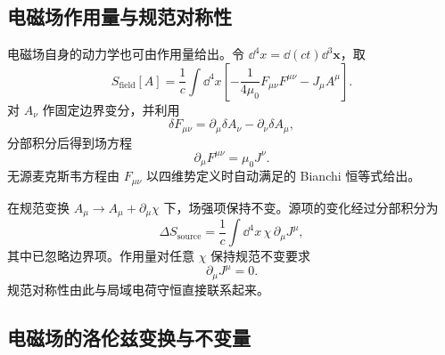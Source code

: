\documentclass[style=classic,color=full]{lc-article}
\begin{document}
\subsection{电磁场作用量与规范对称性}

电磁场自身的动力学也可由作用量给出。令 $\dd^4x=\dd(ct)\dd^3\bm x$，取
\begin{equation}
  S_{\mathrm{field}}[A]
  =\frac{1}{c}\int\dd^4x
  \left[
    -\frac{1}{4\mu_0}F_{\mu\nu}F^{\mu\nu}
    -J_\mu A^\mu
  \right].
  \label{eq:electromagneticaction}
\end{equation}
对 $A_\nu$ 作固定边界变分，并利用
\begin{equation*}
  \delta F_{\mu\nu}
  =\partial_\mu\delta A_\nu
  -\partial_\nu\delta A_\mu,
\end{equation*}
分部积分后得到场方程
\begin{equation}
  \partial_\mu F^{\mu\nu}=\mu_0J^\nu.
\end{equation}
无源麦克斯韦方程由 $F_{\mu\nu}$ 以四维势定义时自动满足的 Bianchi 恒等式给出。

在规范变换 $A_\mu\to A_\mu+\partial_\mu\chi$ 下，场强项保持不变。源项的变化经过分部积分为
\begin{equation}
  \Delta S_{\mathrm{source}}
  =\frac{1}{c}\int\dd^4x\,
  \chi\,\partial_\mu J^\mu,
\end{equation}
其中已忽略边界项。作用量对任意 $\chi$ 保持规范不变要求
\begin{equation}
  \partial_\mu J^\mu=0.
\end{equation}
规范对称性由此与局域电荷守恒直接联系起来\cite{griffiths,landau}。

\subsection{电磁场的洛伦兹变换与不变量}
\end{document}
